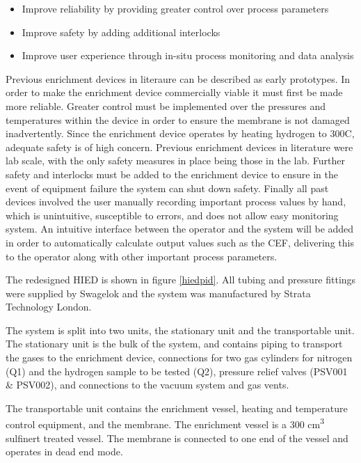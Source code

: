 \begin{itemize}
    \item Improve reliability by providing greater control over process parameters
    \item Improve safety by adding additional interlocks
    \item Improve user experience through in-situ process monitoring and data analysis
\end{itemize}

Previous enrichment devices in literaure can be described as early prototypes.\cite{Ahmed2010} \cite{Murugan2014} In order to make the enrichment device commercially viable it must first be made more reliable. Greater control must be implemented over the pressures and temperatures within the device in order to ensure the membrane is not damaged inadvertently. Since the enrichment device operates by heating hydrogen to 300\textdegree C, adequate safety is of high concern. Previous enrichment devices in literature were lab scale, with the only safety measures in place being those in the lab. Further safety and interlocks must be added to the enrichment device to ensure in the event of equipment failure the system can shut down safety. Finally all past devices involved the user manually recording important process values by hand, which is unintuitive, susceptible to errors, and does not allow easy monitoring system. An intuitive interface between the operator and the system will be added in order to automatically calculate output values such as the CEF, delivering this to the operator along with other important process parameters. 

The redesigned HIED is shown in figure \ref{hiedpid}. All tubing and pressure fittings were supplied by Swagelok \cite{swagelok} and the system was manufactured by Strata Technology London. \cite{stratatechnology}

The system is split into two units, the stationary unit and the transportable unit. The stationary unit is the bulk of the system, and contains piping to transport the gases to the enrichment device, connections for two gas cylinders for nitrogen (Q1) and the hydrogen sample to be tested (Q2), pressure relief valves (PSV001 \& PSV002), and connections to the vacuum system and gas vents. 

The transportable unit contains the enrichment vessel, heating and temperature control equipment, and the membrane. The enrichment vessel is a 300 cm\textsuperscript{3} sulfinert \cite{sulfinerttreatedsamplecylinder} treated vessel. The membrane is connected to one end of the vessel and operates in dead end mode. 

